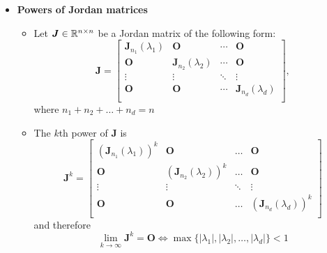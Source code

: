 \documentclass[12pt,a4paper]{article}
\begin{document}
\begin{itemize}
\item \textbf{Powers of Jordan matrices}
  \begin{itemize}
  \item Let $\bm{J}\in \mathbb{R}^{n\times n}$ be a Jordan matrix of the following form:
    \begin{equation}\nonumber%
      \bm{J} =
      \begin{bmatrix}
        \bm{J}_{n_{1}}(\lambda_{1}) & \bm{O} & \cdots & \bm{O} \\
        \bm{O} & \bm{J}_{n_{2}}(\lambda_{2}) & \cdots & \bm{O} \\
        \vdots & \vdots & \ddots & \vdots \\
        \bm{O} & \bm{O} & \cdots & \bm{J}_{n_{d}}(\lambda_{d}) \\
      \end{bmatrix},
    \end{equation}
    where $n_{1}+n_{2}+\ldots + n_{d} = n$
  \item The $k$th power of $\bm{J}$ is
    \begin{equation}\nonumber%
      \bm{J}^{k}
      =
      \begin{bmatrix}
        (\bm{J}_{n_{1}}(\lambda_{1}))^{k} & \bm{O} & \ldots & \bm{O} \\
        \bm{O} & (\bm{J}_{n_{2}}(\lambda_{2}))^{k} & \ldots & \bm{O} \\
        \vdots & \vdots & \ddots & \vdots \\
        \bm{O} & \bm{O} & \ldots & (\bm{J}_{n_{d}}(\lambda_{d}))^{k} \\
      \end{bmatrix}
    \end{equation}
    and therefore
    \begin{equation}\nonumber%
      \lim_{k\to\infty}\bm{J}^{k} = \bm{O}
      \iff
      \max\{|\lambda_{1}|,|\lambda_{2}|, \ldots, |\lambda_{d}|\} < 1
    \end{equation}
  \end{itemize}


\end{itemize}
\end{document}
